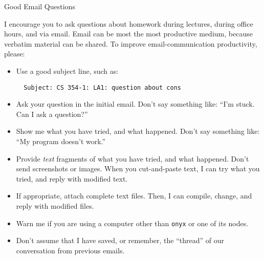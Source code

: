 \documentclass{article}
\begin{document}
\begin{center}\Large
Good Email Questions
\end{center}

I encourage you to ask questions about homework during
lectures, during office hours, and via email. Email can be
most the most productive medium, because verbatim material
can be shared. To improve email-communication productivity,
please:
\begin{itemize}
\item Use a good subject line, such as:
  \begin{Verbatim}
  Subject: CS 354-1: LA1: question about cons
  \end{Verbatim}
\item Ask your question in the initial email. Don't say
  something like: ``I'm stuck. Can I ask a question?''
\item Show me what you have tried, and what happened. Don't
  say something like: ``My program doesn't work.''
\item Provide \emph{text} fragments of what you have tried,
  and what happened. Don't send screenshots or images. When
  you cut-and-paste text, I can try what you tried, and
  reply with modified text.
\item If appropriate, attach complete text files.  Then, I
  can compile, change, and reply with modified files.
\item Warn me if you are using a computer other than
  \texttt{onyx} or one of its nodes.
\item Don't assume that I have saved, or remember, the
  ``thread'' of our conversation from previous emails.
\end{itemize}
\end{document}
